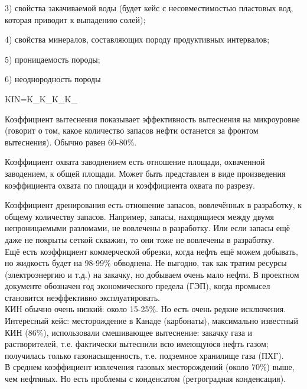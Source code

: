 \documentclass[main.tex]{subfiles}
\begin{document}
3) свойства закачиваемой воды (будет кейс с несовместимостью пластовых вод, которая приводит к выпадению солей);

4) свойства минералов, составляющих породу продуктивных интервалов;

5) проницаемость породы;

6) неоднородность породы


\beq
KIN=K_{}\cdot K_{}\cdot K_{}\cdot K_{}
\eeq

Коэффициент вытеснения показывает эффективность вытеснения на микроуровне (говорит о том, какое количество запасов нефти останется за фронтом вытеснения). Обычно равен 60-80\%. 

Коэффициент охвата заводнением есть отношение площади, охваченной заводением, к общей площади. Может быть представлен в виде произведения коэффициента охвата по площади и коэффициента охвата по разрезу.

Коэффициент дренирования есть отношение запасов, вовлечённых в разработку, к общему количеству запасов. Например, запасы, находящиеся между двумя непроницаемыми разломами, не вовлечены в разработку. Или если запасы ещё даже не покрыты сеткой скважин, то они тоже не вовлечены в разработку.\\

Ещё есть коэффициент коммерческой обрезки, когда нефть ещё можем добывать, но жидкость будет на 98-99\% обводнена. Не выгодно, так как тратим ресурсы (электроэнергию и т.д.) на закачку, но добываем очень мало нефти. В проектном документе обозначен год экономического предела (ГЭП), когда промысел становится неэффективно эксплуатировать.\\ 

КИН обычно очень низкий: около 15-25\%. Но есть очень редкие исключения.\\

Интересный кейс: месторождение в Канаде (карбонаты), максимально известный КИН (86\%), использовали смешивающее вытеснение: закачку газа и растворителей, т.е. фактически вытеснили всю имеющуюся нефть газом; получилась только газонасыщенность, т.е. подземное хранилище газа (ПХГ).\\

В среднем коэффициент извлечения газовых месторождений (около 70\%) выше, чем нефтяных. Но есть проблемы с конденсатом (ретроградная конденсация).

\end{document}
